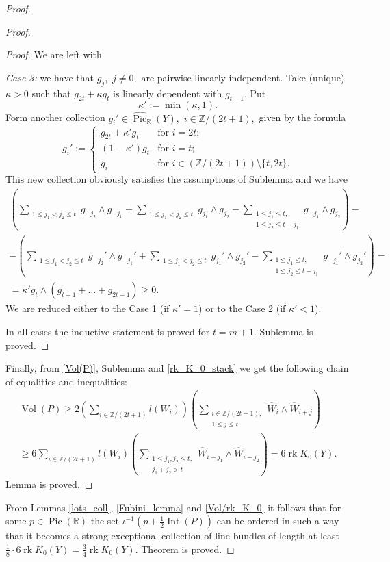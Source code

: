 \documentclass[11pt,leqno]{amsart}
\numberwithin{equation}{section}
\def\R{\mathbb{R}}
\def\Z{\mathbb{Z}}
\newcommand{\Int}{\operatorname{Int}}
\newcommand{\Vol}{\operatorname{Vol}}
\newcommand{\Pic}{\operatorname{Pic}}
\newcommand{\rk}{\operatorname{rk}}
\begin{document}
\begin{proof}
\begin{proof}
\begin{proof}
We are left with

{\it Case 3:} we have that $g_j,$ $j\ne 0,$ are pairwise linearly independent. Take (unique) $\kappa>0$ such that
$g_{2t}+\kappa g_t$ is linearly dependent with $g_{t-1}.$ Put $$\kappa':=\min(\kappa,1).$$
Form another collection $g_i'\in\widehat{\Pic}_{\R}(Y),$
$i\in\Z/(2t+1),$ given by the formula
$$g_i':=\begin{cases}g_{2t}+\kappa'g_t &\text{for }i=2t;\\
(1-\kappa')g_t &\text{for }i=t;\\
g_i &\text{for }i\in(\Z/(2t+1))\setminus\{t,2t\}.\end{cases}$$
This new collection obviously satisfies the assumptions of Sublemma and
we have
\begin{multline}\label{reduce3}(\sum_{\substack{1\leq j_1<j_2\leq t}}g_{-j_2}\wedge g_{-j_1}
+\sum_{\substack{1\leq j_1<j_2\leq t}}g_{j_1}\wedge g_{j_2}-\sum_{\substack{1\leq j_1\leq t,\\
1\leq j_2\leq t-j_1}}g_{-j_1}\wedge g_{j_2})-\\
-(\sum_{\substack{1\leq j_1<j_2\leq t}}g_{-j_2}'\wedge g_{-j_1}'
+\sum_{\substack{1\leq j_1<j_2\leq t}}g_{j_1}'\wedge g_{j_2}'-\sum_{\substack{1\leq j_1\leq t,\\
1\leq j_2\leq t-j_1}}g_{-j_1}'\wedge g_{j_2}')=\\
=\kappa'g_{t}\wedge(g_{t+1}+\dots+g_{2t-1})\geq 0.\end{multline}
We are reduced either to the Case 1 (if $\kappa'=1$) or to the Case 2 (if $\kappa'<1$).

In all cases the inductive statement is proved for $t=m+1.$ Sublemma is proved.
\end{proof}

Finally, from \eqref{Vol(P)}, Sublemma and \eqref{rk_K_0_stack} we get the following chain of equalities and inequalities:
\begin{multline*}\Vol(P)\geq 2(\sum\limits_{i\in\Z/(2t+1)}l(W_i))(\sum_{\substack{i\in\Z/(2t+1),\\
1\leq j\leq t}}\widehat{W}_i\wedge\widehat{W}_{i+j})\\
\geq 6\sum\limits_{i\in\Z/(2t+1)}l(W_i)(\sum_{\substack{1\leq j_1,j_2\leq t,\\
j_1+j_2>t}}\widehat{W}_{i+j_1}\wedge\widehat{W}_{i-j_2})=6\rk K_0(Y).\end{multline*}
Lemma is proved.\end{proof}

From Lemmas \ref{lots_coll}, \ref{Fubini_lemma} and \ref{Vol/rk_K_0} it follows that for some $p\in\Pic(\R)$
the set $\iota^{-1}(p+\frac12\Int(P))$ can be ordered in such a way that it becomes a strong exceptional collection of line bundles
of length at least $\frac18\cdot 6\rk K_0(Y)=\frac34\rk K_0(Y).$ Theorem is proved.\end{proof}
\end{document}
